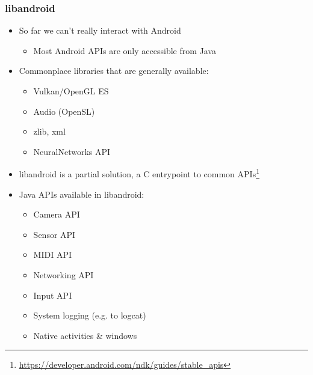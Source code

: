 \documentclass[10pt,mathserif]{beamer}
\begin{document}
	\begin{frame}
		\frametitle{libandroid}

		\begin{itemize}
			\item So far we can't really interact with Android
			\begin{itemize}
				\item Most Android APIs are only accessible from Java
			\end{itemize}
			\item Commonplace libraries that are generally available:
			\begin{itemize}
				\item Vulkan/OpenGL ES
				\item Audio (OpenSL)
				\item zlib, xml
				\item NeuralNetworks API
			\end{itemize}
			\item libandroid is a partial solution, a C entrypoint to common APIs\footnote{\href{https://developer.android.com/ndk/guides/stable\_apis}{https://developer.android.com/ndk/guides/stable\_apis}}
			\item Java APIs available in libandroid:
			\begin{itemize}
				\item Camera API
				\item Sensor API
				\item MIDI API
				\item Networking API
				\item Input API
				\item System logging (e.g. to logcat)
				\item Native activities \& windows
			\end{itemize}
		\end{itemize}
	\end{frame}
\end{document}
